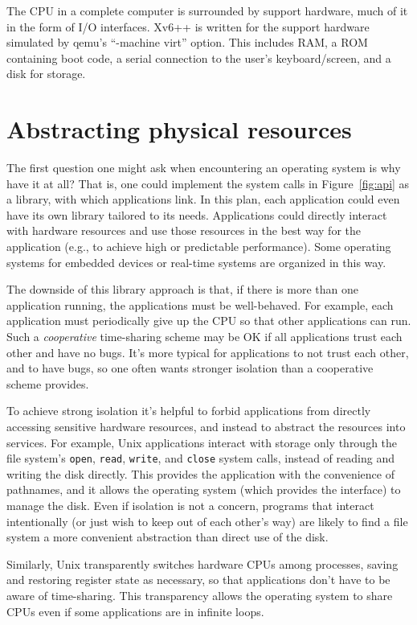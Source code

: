 The CPU in a complete computer is surrounded by support hardware, much
of it in the form of I/O interfaces. Xv6++ is written for the support
hardware simulated by qemu's ``-machine virt'' option. This includes
RAM, a ROM containing boot code, a serial connection to the user's
keyboard/screen, and a disk for storage.

\section{Abstracting physical resources}

The first question one might ask when encountering an operating system is why
have it at all?  That is, one could implement the system calls in
Figure~\ref{fig:api}
as a library, with which applications link.  In this plan,
each application could even have its own library tailored to its needs.
Applications could directly interact with hardware resources
and use those resources in the best way for the application (e.g., to achieve
high or predictable performance).  Some operating systems for
embedded devices or real-time systems are organized in this way.

The downside of this library approach is that, if there is more than one
application running, the applications must be well-behaved.
For example, each application must periodically give up the
CPU so that other applications can run.
Such a
\textit{cooperative}
time-sharing scheme may be OK if all applications trust each
other and have no bugs. It's more typical for applications
to not trust each other, and to have bugs, so one often wants
stronger isolation than a cooperative scheme provides.

To achieve strong isolation it's helpful to forbid applications from
directly accessing sensitive hardware resources, and instead to abstract the
resources into services.  For example, Unix applications interact with storage
only through the file system's
\lstinline{open},
\lstinline{read},
\lstinline{write},
and
\lstinline{close}
system calls,
instead of reading and writing the disk directly.
This provides the application with the convenience of pathnames, and it allows
the operating system (which provides the interface) to manage the disk.
Even if isolation is not a concern,
programs that interact intentionally (or just wish to keep
out of each other's way) are likely to find a file system a more convenient
abstraction than direct use of the disk.

Similarly, Unix transparently switches hardware CPUs among processes,
saving and restoring register state as necessary,
so that applications don't have to be
aware of time-sharing.  This transparency allows the operating system to share
CPUs even if some applications are in infinite loops.

